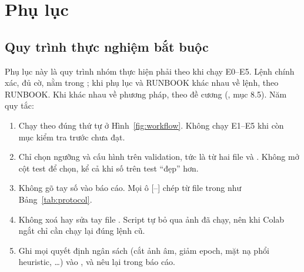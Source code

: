 \clearpage
\appendix
\section*{Phụ lục}
\renewcommand{\thesubsection}{\Alph{subsection}}

\subsection{Quy trình thực nghiệm bắt buộc}
\label{app:protocol}

Phụ lục này là quy trình nhóm thực hiện phải theo khi chạy E0--E5. Lệnh chính xác, đủ cờ, nằm trong
; khi phụ lục và RUNBOOK khác nhau về lệnh, theo RUNBOOK. Khi khác nhau về phương pháp, theo
đề cương (, mục 8.5). Năm quy tắc:
\begin{enumerate}
  \item Chạy theo đúng thứ tự ở Hình~\ref{fig:workflow}. Không chạy E1--E5 khi còn mục kiểm tra trước chưa đạt.
  \item Chỉ chọn ngưỡng và cấu hình trên validation, tức là từ hai file  và
        . Không mở cột test để chọn, kể cả khi số trên test ``đẹp'' hơn.
  \item Không gõ tay số vào báo cáo. Mọi ô \textcolor{badred}{[--]} chép từ file trong  như
        Bảng~\ref{tab:protocol}.
  \item Không xoá hay sửa tay file . Script tự bỏ qua ảnh đã chạy, nên khi Colab ngắt
        chỉ cần chạy lại đúng lệnh cũ.
  \item Ghi mọi quyết định ngân sách (cắt ảnh âm, giảm epoch, mặt nạ phổi heuristic, \dots) vào
        , và nêu lại trong báo cáo.
\end{enumerate}

